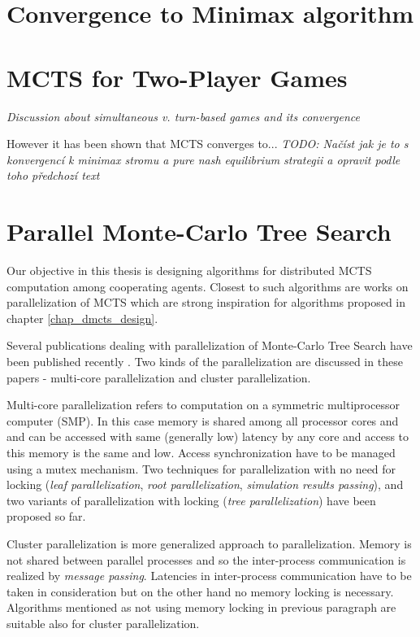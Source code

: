 \section{Convergence to Minimax algorithm}
\label{sec_minimax_convergence}



\section{MCTS for Two-Player Games}
\emph{Discussion about simultaneous v. turn-based games and its convergence}

However it has been shown that MCTS converges to... \emph{TODO: Načíst jak je to s konvergencí k
minimax stromu a pure nash equilibrium strategii a opravit podle toho předchozí text}


\section{Parallel Monte-Carlo Tree Search}
\label{sec_parallel_mcts}


Our objective in this thesis is designing algorithms for distributed MCTS computation among
cooperating agents. Closest to such algorithms are works on parallelization of MCTS which are
strong inspiration for algorithms proposed in chapter \ref{chap_dmcts_design}.

Several publications dealing with parallelization of Monte-Carlo Tree Search have been published
recently \cites{Cazenave2007}{Chaslot2008}{Teytaud2008}. Two kinds of the parallelization are
discussed in these papers - multi-core parallelization and cluster parallelization.

Multi-core parallelization refers to computation on a symmetric multiprocessor computer (SMP). In
this case memory is shared among all processor cores and and can be accessed with same
(generally low) latency by any core  and access to this memory is the same and low.
Access synchronization have to be managed using a mutex mechanism. Two techniques for
parallelization with no need for locking (\emph{leaf parallelization}, \emph{root parallelization},
\emph{simulation results passing}),
and two variants of parallelization with locking (\emph{tree parallelization}) have been proposed so
far. 

Cluster parallelization is more generalized approach to parallelization. Memory is not shared
between parallel processes and so the inter-process communication is realized by \emph{message
passing}. Latencies in inter-process communication have to be taken in consideration but on the
other hand no memory locking is necessary. Algorithms mentioned as not using memory locking in
previous paragraph are suitable also for cluster parallelization.

